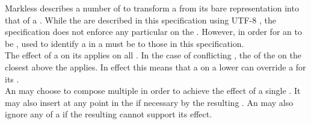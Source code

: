 Markless describes a number of  to transform a  from its bare  representation into that of a . While the  are described in this specification using UTF-8 , the specification does not enforce any particular  on the . However, in order for an  to be ,  used to identify a  in a  must be  to those in this specification. \\

The effect of a  on its  applies on all . In the case of conflicting , the  of the  on the closest  above the  applies. In effect this means that a  on a lower  can override a  for its .  \\

An  may choose to compose multiple  in order to achieve the effect of a single . It may also insert  at any point in the  if necessary by the resulting . An  may also ignore any  of a  if the resulting cannot support its effect.


